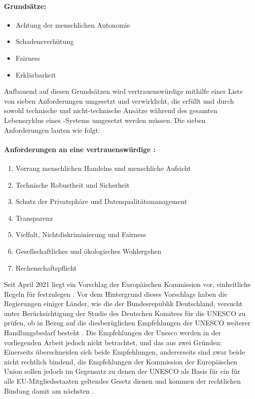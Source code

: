 \documentclass[hidelinks,12pt]{report}
\begin{document}
\paragraph{Grundsätze:}
\begin{itemize}
	\item  Achtung der menschlichen Autonomie
	\item  Schadensverhütung
	\item  Fairness
	\item  Erklärbarkeit
\end{itemize}
Aufbauend auf diesen Grundsätzen wird vertrauenswürdige  mithilfe einer Liste von sieben Anforderungen umgesetzt und verwirklicht, die erfüllt und durch sowohl technische und nicht-technische Ansätze während des gesamten Lebenszyklus eines -Systems umgesetzt werden müssen. Die sieben Anforderungen lauten wie folgt:

\paragraph{Anforderungen an eine vertrauenswürdige :}
\begin{samepage}
	\begin{enumerate}
		\item  Vorrang menschlichen Handelns und menschliche Aufsicht
		\item  Technische Robustheit und Sicherheit
		\item  Schutz der Privatsphäre und Datenqualitätsmanagement
		\item  Transparenz
		\item  Vielfalt, Nichtdiskriminierung und Fairness
		\item  Gesellschaftliches und ökologisches Wohlergehen
		\item  Rechenschaftspflicht
	\end{enumerate}
\end{samepage}
Seit April 2021 liegt ein Vorschlag der Europäischen Kommission vor, einheitliche Regeln für  festzulegen \cite{GesetzesentwurfEUComm}. Vor dem Hintergrund dieses Vorschlags haben die Regierungen einiger Länder, wie die der Bundesrepublik Deutschland, versucht unter Berücksichtigung der Studie des Deutschen Komitees für die UNESCO \cite{Kettemann} zu prüfen, ob in Bezug auf die diesbezüglichen Empfehlungen der UNESCO \cite{UNESCO} weiterer Handlungsbedarf besteht \cite{Deutscher_Bundestag}. Die Empfehlungen der Unesco werden in der vorliegenden Arbeit jedoch nicht betrachtet, und das aus zwei Gründen: Einerseits überschneiden sich beide Empfehlungen, andererseits sind zwar beide nicht rechtlich bindend, die Empfehlungen der Kommission der Europäischen Union sollen jedoch im Gegensatz zu denen der UNESCO als Basis für ein für alle EU-Mitgliedsstaaten geltendes Gesetz dienen und kommen der rechtlichen Bindung damit am nächsten \cite{european_approach}.
\end{document}
